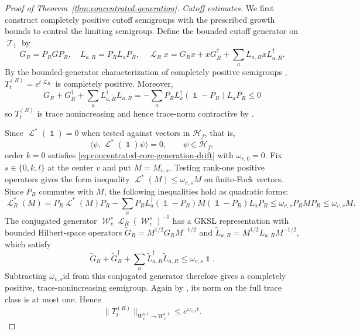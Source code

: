 \documentclass[11pt]{article}
\theoremstyle{myplain}
\theoremstyle{mydefinition}
\theoremstyle{remark}
\DeclareMathOperator{\cL}{\mathcal{L}}
\DeclareMathOperator{\cT}{\mathcal{T}}
\DeclareMathOperator{\cW}{\mathcal{W}}
\DeclareMathOperator{\1}{\mathds{1}}
\begin{document}
    \begin{proof}[Proof of Theorem~\ref{thm:concentrated-generation}]
        \emph{Cutoff estimates.} We first construct completely positive cutoff semigroups with the prescribed growth bounds to control the limiting semigroup. Define the bounded cutoff generator on $\cT_1$ by
        \begin{equation}\label{appx-eq:absorbing-cutoff-generator}
            G_R=P_RGP_R,\quad L_{a,R}=P_RL_aP_R,\quad
            \cL_Rx=G_Rx+xG_R^\dagger+\sum_aL_{a,R}xL_{a,R}^\dagger.
        \end{equation}
        By the bounded-generator characterization of completely positive semigroups \cite{Lindblad.1976}, $T_t^{(R)} = e^{t\cL_R}$ is completely positive. Moreover,
        \begin{equation}\label{appx-eq:absorbing-trace-defect}
            G_R+G_R^\dagger+\sum_aL_{a,R}^\dagger L_{a,R}
            =-\sum_aP_RL_a^\dagger(\1-P_R)L_aP_R\leq0
        \end{equation}
        so $T_t^{(R)}$ is trace nonincreasing and hence trace-norm contractive by \cite[Lem.~2.3.5]{Moebus.2025thesis}.

        Since $\cL^*(\1)=0$ when tested against vectors in $\mathcal H_f$, that is,
        \begin{equation*}
            \langle \psi,\cL^*(\1)\psi\rangle = 0,
            \qquad \psi \in \mathcal H_f,
        \end{equation*}
        order $k=0$ satisfies \eqref{eq:concentrated-core-generation-drift} with $\omega_{v,0}=0$. Fix $s \in \{0,k,l\}$ at the center $v$ and put $M = M_{v,s}$. Testing rank-one positive operators gives the form inequality $\cL^*(M)\leq\omega_{v,s}M$ on finite-Fock vectors. Since $P_R$ commutes with $M$, the following inequalities hold as quadratic forms:
        \begin{equation}\label{appx-eq:absorbing-weighted-drift}
            \cL_R^*(M)
            =P_R\cL^*(M)P_R
            -\sum_aP_RL_a^\dagger(\1-P_R)M(\1-P_R)L_aP_R
            \leq\omega_{v,s}P_RMP_R\leq\omega_{v,s}M.
        \end{equation}
        The conjugated generator $\cW_v^s \cL_R (\cW_v^s)^{-1}$ has a GKSL representation with bounded Hilbert-space operators $\widetilde G_R = M^{1/2}G_RM^{-1/2}$ and $\widetilde L_{a,R} = M^{1/2}L_{a,R}M^{-1/2}$, which satisfy
        \begin{equation}
            \widetilde G_R+\widetilde G_R^\dagger+\sum_a\widetilde L_{a,R}^\dagger\widetilde L_{a,R}\leq\omega_{v,s}\1.
        \end{equation}
        Subtracting $\omega_{v,s}\mathrm{id}$ from this conjugated generator therefore gives a completely positive, trace-nonincreasing semigroup. Again by \cite[Lem.~2.3.5]{Moebus.2025thesis}, its norm on the full trace class is at most one. Hence
        \begin{equation}\label{appx-eq:uniform-cutoff-semigroup}
            \|T_t^{(R)}\|_{W_v^{s,1}\to W_v^{s,1}}\leq e^{\omega_{v,s}t}.
        \end{equation}


\end{proof}
\end{document}
